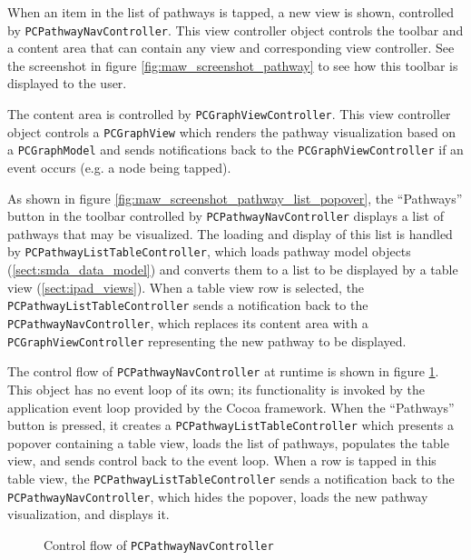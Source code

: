 When an item in the list of pathways is tapped, a new view is shown, controlled
by \texttt{PCPathwayNavController}. This view controller object controls the
toolbar and a content area that can contain any view and corresponding view
controller. See the screenshot in figure \ref{fig:maw_screenshot_pathway} to see
how this toolbar is displayed to the user.

The content area is controlled by \texttt{PCGraphViewController}. This view
controller object controls a \texttt{PCGraphView} which renders the pathway
visualization based on a \texttt{PCGraphModel} and sends notifications back to
the \texttt{PCGraphViewController} if an event occurs (e.g. a node being tapped).

As shown in figure \ref{fig:maw_screenshot_pathway_list_popover}, the
``Pathways'' button in the toolbar controlled by \texttt{PCPathwayNavController}
displays a list of pathways that may be visualized. The loading and display of
this list is handled by \texttt{PCPathwayListTableController}, which loads
pathway model objects (\ref{sect:smda_data_model}) and converts them
to a list to be displayed by a table view (\ref{sect:ipad_views}). When a table
view row is selected, the \texttt{PCPathwayListTableController} sends a
notification back to the \texttt{PCPathwayNavController}, which replaces its
content area with a \texttt{PCGraphViewController} representing the new pathway
to be displayed.

The control flow of \texttt{PCPathwayNavController} at runtime is shown in
figure \ref{fig:maw_controlflow}. This object has no event loop of its own; its
functionality is invoked by the application event loop provided by the Cocoa
framework. When the ``Pathways'' button is pressed, it creates a
\texttt{PCPathwayListTableController} which presents a popover containing a
table view, loads the list of pathways, populates the table view, and sends
control back to the event loop. When a row is tapped in this table view, the
\texttt{PCPathwayListTableController} sends a notification back to the
\texttt{PCPathwayNavController}, which hides the popover, loads the new pathway
visualization, and displays it.

\begin{figure}[thbp]
    \caption{\label{fig:maw_controlflow} Control flow of
    \texttt{PCPathwayNavController}}
\end{figure}


